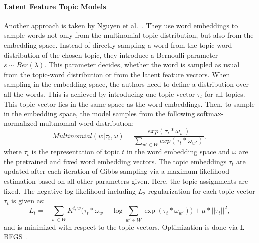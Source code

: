 \documentclass[
        a4paper,
        titlepage,
        twoside,
        parskip
        ]{scrbook}
\theoremstyle{break}
\begin{document}
\paragraph{Latent Feature Topic Models}
Another approach is taken by Nguyen et al.~\cite{Nguyen2015}.
They use word embeddings to sample words not only from the multinomial topic distribution, but also from the embedding space.
Instead of directly sampling a word from the topic-word distribution of the chosen topic, they introduce a Bernoulli parameter $s \sim Ber(\lambda)$.
This parameter decides, whether the word is sampled as usual from the topic-word distribution or from the latent feature vectors.
When sampling in the embedding space, the authors need to define a distribution over all the words.
This is achieved by introducing one topic vector $\tau_t$ for all topics.
This topic vector lies in the same space as the word embeddings.
Then, to sample in the embedding space, the model samples from the following softmax-normalized multinomial word distribution:
\begin{equation*}
    Multinomial(w | \tau_t, \omega) = \frac{exp(\tau_t * \omega_w)}{\sum_{w' \in W} exp(\tau_t * \omega_{w'})},
\end{equation*}
where $\tau_t$ is the representation of topic $t$ in the word embedding space and $\omega$ are the pretrained and fixed word embedding vectors.
The topic embeddings $\tau_t$ are updated after each iteration of Gibbs sampling via a maximum likelihood estimation based on all other parameters given.
Here, the topic assignments are fixed.
The negative log likelihood including $L_2$ regularization for each topic vector $\tau_t$ is given as:
\begin{equation*}
    L_t = - \sum_{w \in W} K^{t,w} \Big(\tau_t * \omega_w - \log \sum_{w' \in W} \exp (\tau_t * \omega_{w'}) \Big) + \mu * || \tau_t ||^2,
\end{equation*}
and is minimized with respect to the topic vectors.
Optimization is done via L-BFGS~\cite{Liu1989}.
\end{document}
